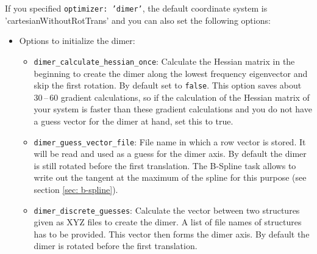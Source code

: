 \documentclass[]{tufte-book}
\begin{document}
If you specified \texttt{optimizer: 'dimer'}, the default coordinate system is 'cartesianWithoutRotTrans'
and you can also set the following options:
\begin{itemize}
\item Options to initialize the dimer:
\begin{itemize}
\item \texttt{dimer\_calculate\_hessian\_once}: Calculate the Hessian matrix in the beginning to create the dimer along the lowest frequency eigenvector and skip the first rotation. By default set to \texttt{false}. This option saves about 30\,--\,60 gradient calculations, so if the calculation of the Hessian matrix of your system is faster than these gradient calculations and you do not have a guess vector for the dimer at hand, set this to true.
\item \texttt{dimer\_guess\_vector\_file}: File name in which a row vector is stored. It will be read and used as a guess for the dimer axis. By default the dimer is still rotated before the first translation. The B-Spline task allows to write out the tangent at the maximum of the spline for this purpose (see section \ref{sec: b-spline}).
\item \texttt{dimer\_discrete\_guesses}: Calculate the vector between two structures given as XYZ files to create the dimer. A list of file names of structures has to be provided. This vector then forms the dimer axis. By default the dimer is rotated before the first translation.


\end{itemize}
\end{itemize}
\end{document}
